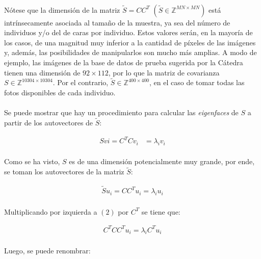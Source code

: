 \documentclass[12pt, twocolumn]{article}
\begin{document}
	\paragraph{} Nótese que la dimensión de la matriz $\widetilde{S} = CC^{T}$  $(\widetilde{S} \in \mathbb{Z}^{MN \times MN})$ está intrínsecamente asociada al tamaño de la muestra, ya sea del número de individuos y/o del de caras por individuo. Estos valores serán, en la mayoría de los casos, de una magnitud muy inferior a la cantidad de píxeles de las imágenes y, además, las posibilidades de manipularlos son mucho más amplias. A modo de ejemplo, las imágenes de la base de datos de prueba sugerida por la Cátedra \cite{dbf} tienen una dimensión de $92 \times 112$, por lo que la matriz de covarianza $S \in \mathbb{Z}^{10304\times 10304}$. Por el contrario, $\widetilde{S} \in \mathbb{Z}^{400 \times 400}$, en el caso de tomar todas las fotos disponibles de cada individuo.
	
	\paragraph{} Se puede mostrar que hay un procedimiento para calcular las \textit{eigenfaces} de $S$ a partir de los autovectores de $\widetilde{S}$:
	
	\begin{align}
		Sv {i} = C^{T}Cv_{i} &= \lambda_{i}v_{i}
	\end{align}
	
	\paragraph{} Como se ha visto, $S$ es de una dimensión potencialmente muy grande, por ende, se toman los autovectores de la matriz $\widetilde{S}$:
	
	\begin{align}
		\widetilde{S}u_{i} = CC^{T}u_{i} = \lambda_{i}u_{i}
	\end{align}
	
	\paragraph{} Multiplicando por izquierda a $(2)$ por $C^{T}$ se tiene que:
	
	\begin{align}
		C^{T}CC^{T}u_{i} = \lambda_{i}C^{T}u_{i} 
	\end{align}
	
	\paragraph{} Luego, se puede renombrar:
	
\end{document}
